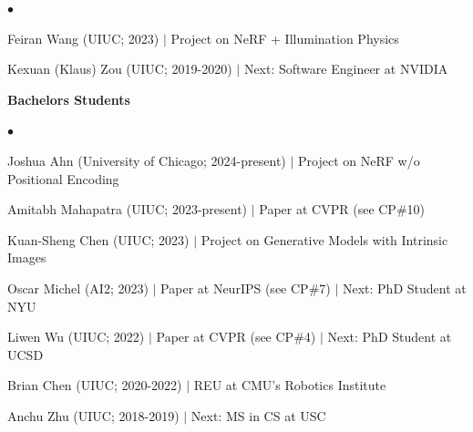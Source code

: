 \documentclass[margin,line]{res}
\newenvironment{list2}{
  \begin{list}{$\bullet$}{%
      \setlength{\itemsep}{0in}
      \setlength{\parsep}{0in} \setlength{\parskip}{0in}
      \setlength{\topsep}{0in} \setlength{\partopsep}{0in} 
      \setlength{\leftmargin}{0.2in}}}{\end{list}}
\begin{document}
\begin{resume}
\begin{list2}
\item Feiran Wang (UIUC; 2023) $|$ Project on NeRF + Illumination Physics
\item Kexuan (Klaus) Zou (UIUC; 2019-2020) $|$ Next: Software Engineer at NVIDIA
\end{list2}
{\bf Bachelors Students}\\\vspace*{-0.15in}
\begin{list2}
\item Joshua Ahn (University of Chicago; 2024-present) $|$ Project on NeRF w/o Positional Encoding
\item Amitabh Mahapatra (UIUC; 2023-present)  $|$ Paper at CVPR (see CP\#10)
\item Kuan-Sheng Chen (UIUC; 2023) $|$ Project on Generative Models with Intrinsic Images
\item Oscar Michel (AI2; 2023) $|$ Paper at NeurIPS (see CP\#7) $|$ Next: PhD Student at NYU
\item Liwen Wu (UIUC; 2022) $|$ Paper at CVPR (see CP\#4) $|$ Next: PhD Student at UCSD
\item Brian Chen (UIUC; 2020-2022)  $|$ REU at CMU's Robotics Institute
\item Anchu Zhu (UIUC; 2018-2019) $|$ Next: MS in CS at USC 
\end{list2}


\end{resume}
\end{document}
